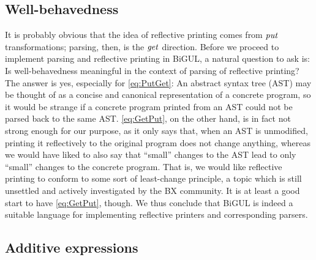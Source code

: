 \subsection{Well-behavedness}

It is probably obvious that the idea of reflective printing comes from \ensuremath{\Varid{put}} transformations; parsing, then, is the \ensuremath{\Varid{get}} direction.
Before we proceed to implement parsing and reflective printing in BiGUL, a natural question to ask is:
Is well-behavedness meaningful in the context of parsing of reflective printing?
The answer is yes, especially for \ref{eq:PutGet}: An abstract syntax tree (AST) may be thought of as a concise and canonical representation of a concrete program, so it would be strange if a concrete program printed from an AST could not be parsed back to the same AST.
\ref{eq:GetPut}, on the other hand, is in fact not strong enough for our purpose, as it only says that, when an AST is unmodified, printing it reflectively to the original program does not change anything, whereas we would have liked to also say that ``small'' changes to the AST lead to only ``small'' changes to the concrete program.
That is, we would like reflective printing to conform to some sort of least-change principle, a topic which is still unsettled and actively investigated by the BX community.
It is at least a good start to have \ref{eq:GetPut}, though.
We thus conclude that BiGUL is indeed a suitable language for implementing reflective printers and corresponding parsers.


\subsection{Additive expressions}


